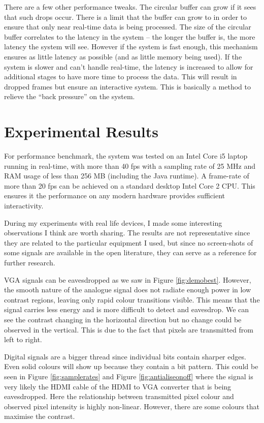 \documentclass[a4paper,12pt,twoside,openright]{report}
\begin{document}
There are a few other performance tweaks. The circular buffer can grow if it sees that such drops occur. There is a limit that the buffer can grow to in order to ensure that only near real-time data is being processed. The size of the circular buffer correlates to the latency in the system -- the longer the buffer is, the more latency the system will see. However if the system is fast enough, this mechanism ensures as little latency as possible (and as little memory being used). If the system is slower and can't handle real-time, the latency is increased to allow for additional stages to have more time to process the data. This will result in dropped frames but ensure an interactive system. This is basically a method to relieve the ``back pressure'' on the system. 

\section{Experimental Results}

For performance benchmark, the system was tested on an Intel Core i5 laptop running in real-time, with more than 40 fps with a sampling rate of 25 MHz and RAM usage of less than 256 MB (including the Java runtime). A frame-rate of more than 20 fps can be achieved on a standard desktop Intel Core 2 CPU. This ensures it the performance on any modern hardware provides sufficient interactivity.

During my experiments with real life devices, I made some interesting observations I think are worth sharing. The results are not representative since they are related to the particular equipment I used, but since no screen-shots of some signals are available in the open literature, they can serve as a reference for further research.

VGA signals can be eavesdropped as we saw in Figure \ref{fig:demobest}. However, the smooth nature of the analogue signal does not radiate enough power in low contrast regions, leaving only rapid colour transitions visible. This means that the signal carries less energy and is more difficult to detect and eavesdrop. We can see the contrast changing in the horizontal direction but no change could be observed in the vertical. This is due to the fact that pixels are transmitted from left to right.

Digital signals are a bigger thread since individual bits contain sharper edges. Even solid colours will show up because they contain a bit pattern. This could be seen in Figure \ref{fig:samplerates} and Figure \ref{fig:antialiseonoff}  where the signal is very likely the HDMI cable of the HDMI to VGA converter that is being eavesdropped. Here the relationship between transmitted pixel colour and observed pixel intensity is highly non-linear. However, there are some colours that maximise the contrast.
\end{document}
